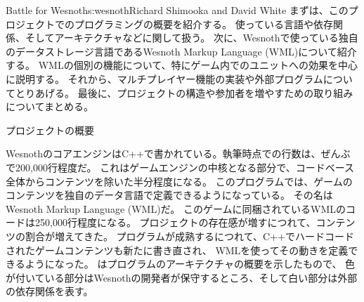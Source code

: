 \begin{aosachapter}{Battle for Wesnoth}{s:wesnoth}{Richard Shimooka and David White}
まずは、このプロジェクトでのプログラミングの概要を紹介する。
使っている言語や依存関係、そしてアーキテクチャなどに関して扱う。
次に、Wesnothで使っている独自のデータストレージ言語であるWesnoth Markup Language (WML)について紹介する。
WMLの個別の機能について、特にゲーム内でのユニットへの効果を中心に説明する。
それから、マルチプレイヤー機能の実装や外部プログラムについてとりあげる。
最後に、プロジェクトの構造や参加者を増やすための取り組みについてまとめる。

\begin{aosasect1}{プロジェクトの概要}

WesnothのコアエンジンはC++で書かれている。執筆時点での行数は、ぜんぶで200,000行程度だ。
これはゲームエンジンの中核となる部分で、コードベース全体からコンテンツを除いた半分程度になる。
このプログラムでは、ゲームのコンテンツを独自のデータ言語で定義できるようになっている。
その名はWesnoth Markup Language (WML)だ。
このゲームに同梱されているWMLのコードは250,000行程度になる。
プロジェクトの存在感が増すにつれて、コンテンツの割合が増えてきた。
プログラムが成熟するにつれて、C++でハードコードされたゲームコンテンツも新たに書き直され、
WMLを使ってその動きを定義できるようになった。
はプログラムのアーキテクチャの概要を示したもので、
色が付いている部分はWesnothの開発者が保守するところ、そして白い部分は外部の依存関係を表す。


\end{aosasect1}
\end{aosachapter}
